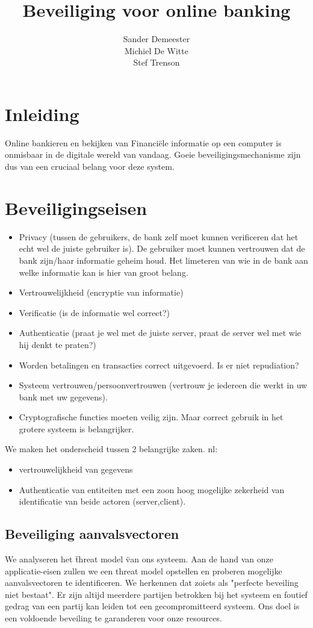\documentclass[11pt]{article}
\title{\textbf{Beveiliging voor online banking}}
\author{Sander Demeester\\
		Michiel De Witte\\
		Stef Trenson}
\date{}
\begin{document}
\maketitle

\section{Inleiding}
Online bankieren en bekijken van Financi\"ele informatie op een computer is onmisbaar in de digitale wereld van vandaag. Goeie beveiligingsmechanisme zijn dus van een cruciaal belang voor deze system. 

\section{Beveiligingseisen}
\begin{itemize}
\item Privacy (tussen de gebruikers, de bank zelf moet kunnen verificeren dat het echt wel de juiste gebruiker is). De gebruiker moet kunnen vertrouwen dat de bank zijn/haar informatie geheim houd. Het limeteren van wie in de bank aan welke informatie kan is hier van groot belang.
\item Vertrouwelijkheid (encryptie van informatie)
\item Verificatie (is de informatie wel correct?)
\item Authenticatie (praat je wel met de juiste server, praat de server wel met wie hij denkt te praten?)
\item Worden betalingen en transacties correct uitgevoerd. Is er niet repudiation?
\item Systeem vertrouwen/persoonvertrouwen (vertrouw je iedereen die werkt in uw bank met uw gegevens).
\item Cryptografische functies moeten veilig zijn. Maar correct gebruik in het grotere systeem is belangrijker.

\end{itemize}
We maken het onderscheid tussen 2 belangrijke zaken. nl: 
\begin{itemize}
\item vertrouwelijkheid van gegevens
\item Authenticatie van entiteiten met een zoon hoog mogelijke zekerheid van identificatie van beide actoren (server,client).
\end{itemize}
\subsection{Beveiliging aanvalsvectoren}
We analyseren het \" threat model \" van ons systeem. Aan de hand van onze applicatie-eisen zullen we een threat model opstellen en proberen mogelijke aanvalsvectoren te identificeren. We herkennen dat zoiets als "perfecte beveiling niet bestaat". Er zijn altijd meerdere partijen betrokken bij het systeem en foutief gedrag van een partij kan leiden tot een gecompromitteerd systeem. Ons doel is een voldoende beveiling te garanderen voor onze resources.
\end{document}

